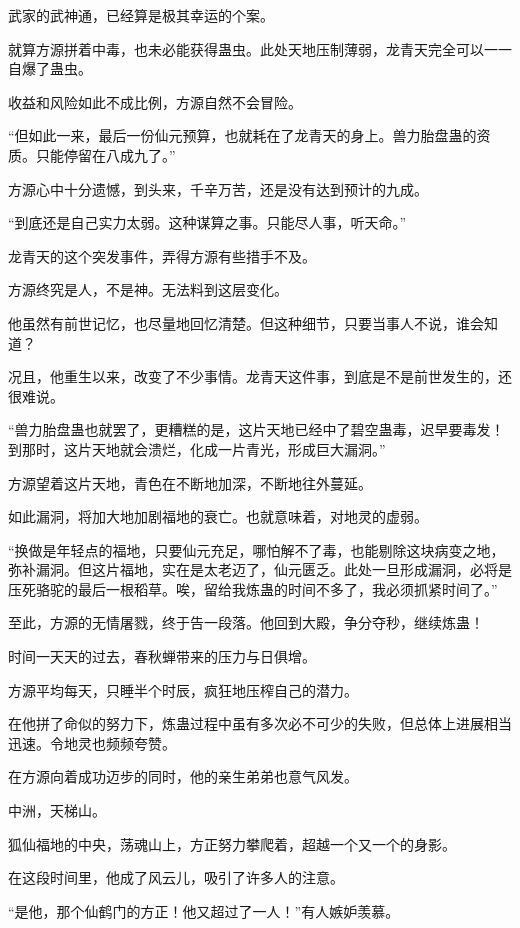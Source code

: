 \begin{this_body}
武家的武神通，已经算是极其幸运的个案。

就算方源拼着中毒，也未必能获得蛊虫。此处天地压制薄弱，龙青天完全可以一一自爆了蛊虫。

收益和风险如此不成比例，方源自然不会冒险。

“但如此一来，最后一份仙元预算，也就耗在了龙青天的身上。兽力胎盘蛊的资质。只能停留在八成九了。”

方源心中十分遗憾，到头来，千辛万苦，还是没有达到预计的九成。

“到底还是自己实力太弱。这种谋算之事。只能尽人事，听天命。”

龙青天的这个突发事件，弄得方源有些措手不及。

方源终究是人，不是神。无法料到这层变化。

他虽然有前世记忆，也尽量地回忆清楚。但这种细节，只要当事人不说，谁会知道？

况且，他重生以来，改变了不少事情。龙青天这件事，到底是不是前世发生的，还很难说。

“兽力胎盘蛊也就罢了，更糟糕的是，这片天地已经中了碧空蛊毒，迟早要毒发！到那时，这片天地就会溃烂，化成一片青光，形成巨大漏洞。”

方源望着这片天地，青色在不断地加深，不断地往外蔓延。

如此漏洞，将加大地加剧福地的衰亡。也就意味着，对地灵的虚弱。

“换做是年轻点的福地，只要仙元充足，哪怕解不了毒，也能剔除这块病变之地，弥补漏洞。但这片福地，实在是太老迈了，仙元匮乏。此处一旦形成漏洞，必将是压死骆驼的最后一根稻草。唉，留给我炼蛊的时间不多了，我必须抓紧时间了。”

至此，方源的无情屠戮，终于告一段落。他回到大殿，争分夺秒，继续炼蛊！

时间一天天的过去，春秋蝉带来的压力与日俱增。

方源平均每天，只睡半个时辰，疯狂地压榨自己的潜力。

在他拼了命似的努力下，炼蛊过程中虽有多次必不可少的失败，但总体上进展相当迅速。令地灵也频频夸赞。

在方源向着成功迈步的同时，他的亲生弟弟也意气风发。

中洲，天梯山。

狐仙福地的中央，荡魂山上，方正努力攀爬着，超越一个又一个的身影。

在这段时间里，他成了风云儿，吸引了许多人的注意。

“是他，那个仙鹤门的方正！他又超过了一人！”有人嫉妒羡慕。


\end{this_body}
